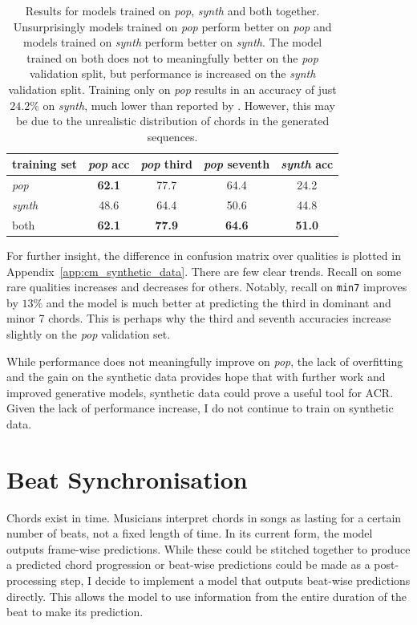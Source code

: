 \begin{table}[h]
    \centering
    \begin{tabular}{lcccc}
        \toprule
        training set & \emph{pop} acc & \emph{pop} third & \emph{pop} seventh & \emph{synth} acc \\  
        \midrule
        \emph{pop} & \textbf{62.1} & 77.7 & 64.4 & 24.2 \\
        \emph{synth} & 48.6 & 64.4 & 50.6 & 44.8 \\
        both & \textbf{62.1} & \textbf{77.9}  & \textbf{64.6} & \textbf{51.0} \\
        \bottomrule
    \end{tabular}
    \caption{Results for models trained on \emph{pop}, \emph{synth} and both together. Unsurprisingly models trained on \emph{pop} perform better on \emph{pop} and models trained on \emph{synth} perform better on \emph{synth}. The model trained on both does not to meaningfully better on the \emph{pop} validation split, but performance is increased on the \emph{synth} validation split. Training only on \emph{pop} results in an accuracy of just $24.2\%$ on \emph{synth}, much lower than reported by \citet{MusiConGen}. However, this may be due to the unrealistic distribution of chords in the generated sequences. }\label{tab:synthetic_data}
\end{table}

For further insight, the difference in confusion matrix over qualities is plotted in Appendix~\ref{app:cm_synthetic_data}. There are few clear trends. Recall on some rare qualities increases and decreases for others. Notably, recall on \texttt{min7} improves by $13\%$ and the model is much better at predicting the third in dominant and minor 7 chords. This is perhaps why the third and seventh accuracies increase slightly on the \emph{pop} validation set. 

While performance does not meaningfully improve on \emph{pop}, the lack of overfitting and the gain on the synthetic data provides hope that with further work and improved generative models, synthetic data could prove a useful tool for ACR. Given the lack of performance increase, I do not continue to train on synthetic data.

\section{Beat Synchronisation}\label{sec:beat-synchronisation}

Chords exist in time. Musicians interpret chords in songs as lasting for a certain number of beats, not a fixed length of time. In its current form, the model outputs frame-wise predictions. While these could be stitched together to produce a predicted chord progression or beat-wise predictions could be made as a post-processing step, I decide to implement a model that outputs beat-wise predictions directly. This allows the model to use information from the entire duration of the beat to make its prediction.

